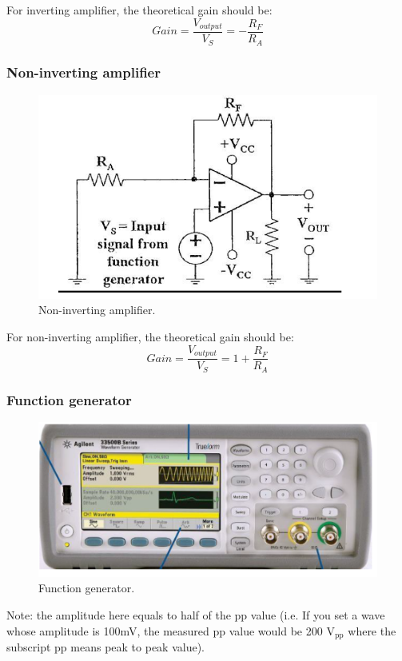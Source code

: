 \documentclass{article}
\begin{document}
For inverting amplifier, the theoretical gain should be:
$$Gain = \frac{V_{output}}{V_S} = -\frac{R_F}{R_A}$$

\subsubsection{Non-inverting amplifier}

\begin{figure}[H]
\centering
\includegraphics[scale=1]{noninverting.png}
\caption{Non-inverting amplifier.}\label{FigNonInv}
\end{figure}

For non-inverting amplifier, the theoretical gain should be:
$$Gain = \frac{V_{output}}{V_S} = 1 + \frac{R_F}{R_A}$$

\subsubsection{Function generator}

\begin{figure}[H]
\centering
\includegraphics[scale=0.8]{function.png}
\caption{Function generator.}\label{FigFunction}
\end{figure}
Note: the amplitude here equals to half of the pp value (i.e. If you set a wave whose amplitude is 100mV, the measured pp value would be 200 $\text{V}_{\text{pp}}$ where the subscript pp means peak to peak value). 
\end{document}
